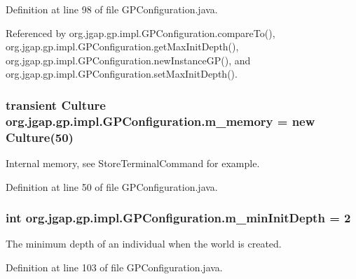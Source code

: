 Definition at line 98 of file G\-P\-Configuration.\-java.



Referenced by org.\-jgap.\-gp.\-impl.\-G\-P\-Configuration.\-compare\-To(), org.\-jgap.\-gp.\-impl.\-G\-P\-Configuration.\-get\-Max\-Init\-Depth(), org.\-jgap.\-gp.\-impl.\-G\-P\-Configuration.\-new\-Instance\-G\-P(), and org.\-jgap.\-gp.\-impl.\-G\-P\-Configuration.\-set\-Max\-Init\-Depth().

\hypertarget{classorg_1_1jgap_1_1gp_1_1impl_1_1_g_p_configuration_a7e50c9aabf2bc85ca304a6b1c59b35a4}{
\subsubsection[{m\-\_\-memory}]{\setlength{\rightskip}{0pt plus 5cm}transient Culture org.\-jgap.\-gp.\-impl.\-G\-P\-Configuration.\-m\-\_\-memory = new Culture(50)\hspace{0.3cm}{\ttfamily [private]}}}\label{classorg_1_1jgap_1_1gp_1_1impl_1_1_g_p_configuration_a7e50c9aabf2bc85ca304a6b1c59b35a4}
Internal memory, see Store\-Terminal\-Command for example. 

Definition at line 50 of file G\-P\-Configuration.\-java.

\hypertarget{classorg_1_1jgap_1_1gp_1_1impl_1_1_g_p_configuration_a2704eaa3eb0e8f1c6ea87195e2e48c79}{
\subsubsection[{m\-\_\-min\-Init\-Depth}]{\setlength{\rightskip}{0pt plus 5cm}int org.\-jgap.\-gp.\-impl.\-G\-P\-Configuration.\-m\-\_\-min\-Init\-Depth = 2\hspace{0.3cm}{\ttfamily [private]}}}\label{classorg_1_1jgap_1_1gp_1_1impl_1_1_g_p_configuration_a2704eaa3eb0e8f1c6ea87195e2e48c79}
The minimum depth of an individual when the world is created. 

Definition at line 103 of file G\-P\-Configuration.\-java.



